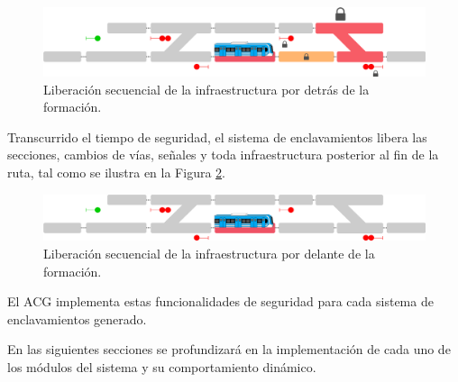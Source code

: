 	\begin{figure}[!h]
	  \centering
	  \includegraphics[width=1\textwidth]{Figuras/secuencial_3}
	  \centering\caption{Liberación secuencial de la infraestructura por detrás de la formación.}
	  \label{fig:ACG_secuencial_3}
	\end{figure}
 
 	Transcurrido el tiempo de seguridad, el sistema de enclavamientos libera las secciones, cambios de vías, señales y toda infraestructura posterior al fin de la ruta, tal como se ilustra en la Figura \ref{fig:ACG_secuencial_4}.

	 \begin{figure}[!h]
	     \centering
	     \includegraphics[width=1\textwidth]{Figuras/secuencial_4}
	     \centering\caption{Liberación secuencial de la infraestructura por delante de la formación.}
	     \label{fig:ACG_secuencial_4}
	 \end{figure}
	    
	El ACG implementa estas funcionalidades de seguridad para cada sistema de enclavamientos generado. 
	
	En las siguientes secciones se profundizará en la implementación de cada uno de los módulos del sistema y su comportamiento dinámico.